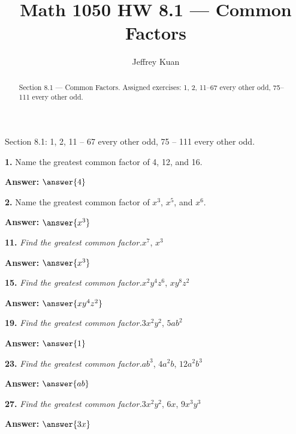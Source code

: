 \documentclass{ximera}
\author{Jeffrey Kuan}
\title{Math 1050 HW 8.1 --- Common Factors}
\begin{document}
\begin{abstract}
    Section 8.1 --- Common Factors.
    Assigned exercises: 1, 2, 11–67 every other odd, 75–111 every other odd.
\end{abstract}

\maketitle

Section 8.1: 1, 2, 11 – 67 every other odd, 75 – 111 every other odd. %

\begin{problem}
\textbf{1.} Name the greatest common factor of 4, 12, and 16.

\textbf{Answer:} $\answer{4}$
\end{problem}

\begin{problem}
\textbf{2.} Name the greatest common factor of $x^3$, $x^5$, and $x^6$.

\textbf{Answer:} $\answer{x^3}$
\end{problem}

\begin{problem}
\textbf{11.} \emph{Find the greatest common factor.}\quad $x^7$, $x^3$

\textbf{Answer:} $\answer{x^3}$
\end{problem}

\begin{problem}
\textbf{15.} \emph{Find the greatest common factor.}\quad $x^2y^4z^6$, $xy^8z^2$

\textbf{Answer:} $\answer{xy^4z^2}$
\end{problem}

\begin{problem}
\textbf{19.} \emph{Find the greatest common factor.}\quad $3x^2y^2$, $5ab^2$

\textbf{Answer:} $\answer{1}$
\end{problem}

\begin{problem}
\textbf{23.} \emph{Find the greatest common factor.}\quad $ab^3$, $4a^2b$, $12a^2b^3$

\textbf{Answer:} $\answer{ab}$
\end{problem}

\begin{problem}
\textbf{27.} \emph{Find the greatest common factor.}\quad $3x^2y^2$, $6x$, $9x^3y^3$

\textbf{Answer:} $\answer{3x}$
\end{problem}
\end{document}
